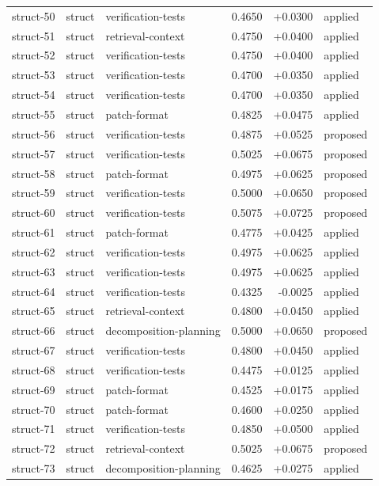 \begin{center}
\begin{longtable}{llp{5.2cm}rrl}
struct-50 & struct & verification-tests & 0.4650 & +0.0300 & applied \\
struct-51 & struct & retrieval-context & 0.4750 & +0.0400 & applied \\
struct-52 & struct & verification-tests & 0.4750 & +0.0400 & applied \\
struct-53 & struct & verification-tests & 0.4700 & +0.0350 & applied \\
struct-54 & struct & verification-tests & 0.4700 & +0.0350 & applied \\
struct-55 & struct & patch-format & 0.4825 & +0.0475 & applied \\
struct-56 & struct & verification-tests & 0.4875 & +0.0525 & proposed \\
struct-57 & struct & verification-tests & 0.5025 & +0.0675 & proposed \\
struct-58 & struct & patch-format & 0.4975 & +0.0625 & proposed \\
struct-59 & struct & verification-tests & 0.5000 & +0.0650 & proposed \\
struct-60 & struct & verification-tests & 0.5075 & +0.0725 & proposed \\
struct-61 & struct & patch-format & 0.4775 & +0.0425 & applied \\
struct-62 & struct & verification-tests & 0.4975 & +0.0625 & applied \\
struct-63 & struct & verification-tests & 0.4975 & +0.0625 & applied \\
struct-64 & struct & verification-tests & 0.4325 & -0.0025 & applied \\
struct-65 & struct & retrieval-context & 0.4800 & +0.0450 & applied \\
struct-66 & struct & decomposition-planning & 0.5000 & +0.0650 & proposed \\
struct-67 & struct & verification-tests & 0.4800 & +0.0450 & applied \\
struct-68 & struct & verification-tests & 0.4475 & +0.0125 & applied \\
struct-69 & struct & patch-format & 0.4525 & +0.0175 & applied \\
struct-70 & struct & patch-format & 0.4600 & +0.0250 & applied \\
struct-71 & struct & verification-tests & 0.4850 & +0.0500 & applied \\
struct-72 & struct & retrieval-context & 0.5025 & +0.0675 & proposed \\
struct-73 & struct & decomposition-planning & 0.4625 & +0.0275 & applied \\

\end{longtable}
\end{center}
